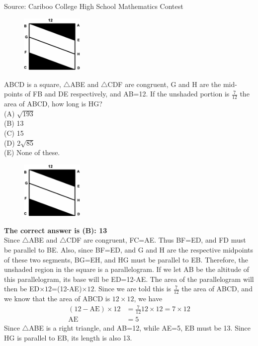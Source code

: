 \documentclass{article}
\begin{document}
\scriptsize
Source: Cariboo College High School Mathematics Contest

\normalsize
\begin{figure}
	\includegraphics[width=30mm,viewport=44 173 501 563]{CCJPR74-11pic.eps}
\end{figure}
ABCD is a square, $\triangle$ABE and $\triangle$CDF are congruent, G and H are the mid-points of FB and DE respectively, and AB=12. If the unshaded portion is $\frac{7}{12}$ the area of ABCD, how long is HG?\\
(A) $\sqrt{193}$\\
(B) 13\\
(C) 15\\
(D) $2\sqrt{85}$\\
(E) None of these.\\

\begin{figure}
	\includegraphics[width=30mm,viewport=44 173 501 563]{CCJPR74-11pic.eps}
\end{figure}

\textbf{The correct answer is (B): 13}\\[1 ex]
Since $\triangle$ABE and $\triangle$CDF are congruent, FC=AE. Thus BF=ED, and FD must be parallel to BE. Also, since BF=ED, and G and H are the respective midpoints of these two segments, BG=EH, and HG must be parallel to EB. Therefore, the unshaded region in the square is a parallelogram. If we let AB be the altitude of this parallelogram, its base will be ED=12-AE. The area of the parallelogram will then be ED$\times12$=(12-AE)$\times12$. Since we are told this is $\frac{7}{12}$ the area of ABCD, and we know that the area of ABCD is $12\times12$, we have
\begin{align*}
(12-\textrm{AE})\times12&=\frac{7}{12}12\times12=7\times12\\
\textrm{AE}&=5
\end{align*}
Since $\triangle$ABE is a right triangle, and AB=12, while AE=5, EB must be 13. Since HG is parallel to EB, its length is also 13.
\\[5 ex]
\end{document}
